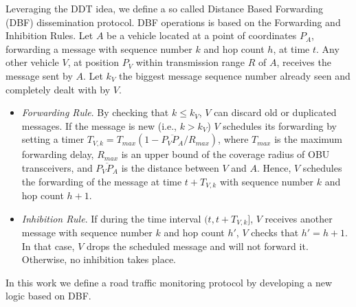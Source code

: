 \documentclass[conference]{IEEEtran}
\begin{document}
Leveraging the DDT idea, we define a so called Distance Based Forwarding (DBF) dissemination protocol. DBF operations is based on the Forwarding and Inhibition Rules. Let $A$ be a vehicle located at a point of coordinates $P_A$, forwarding a message with sequence number $k$ and hop count $h$, at time $t$. Any other vehicle $V$, at position $P_V$ within transmission range $R$ of $A$, receives the message sent by $A$. Let $k_V$ the biggest message sequence number already seen and completely dealt with by $V$.
\begin{itemize}
  \item \textit{Forwarding Rule}. By checking that $k \le k_V$, $V$ can discard old or duplicated messages. If the message is new (i.e., $k > k_V$) $V$ schedules its forwarding by setting a timer $T_{V,k}=T_{max}(1-\overline{P_VP_A}/R_{max})$, where $T_{max}$ is the maximum forwarding delay, $R_{max}$ is an upper bound of the coverage radius of OBU transceivers, and $\overline{P_VP_A}$ is the distance between $V$ and $A$. Hence, $V$ schedules the forwarding of the message at time $t+T_{V,k}$ with sequence number $k$ and hop count $h+1$.
  \item \textit{Inhibition Rule}. If during the time interval $(t, t+T_{V,k}]$, $V$ receives another message with sequence number $k$ and hop count $h'$, $V$ checks that $h'=h+1$. In that case, $V$ drops the scheduled message and will not forward it. Otherwise, no inhibition takes place.
\end{itemize}

In this work we define a road traffic monitoring protocol by developing a new logic based on DBF.
\end{document}
